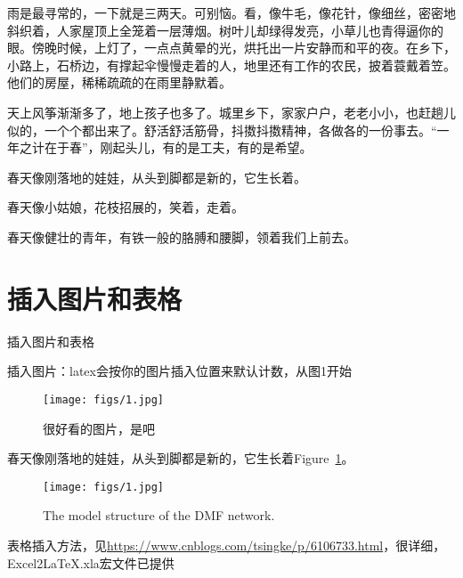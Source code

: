 \documentclass[UTF8]{ctexart}
\begin{document}
雨是最寻常的，一下就是三两天。可别恼。看，像牛毛，像花针，像细丝，密密地斜织着，人家屋顶上全笼着一层薄烟。树叶儿却绿得发亮，小草儿也青得逼你的眼。傍晚时候，上灯了，一点点黄晕的光，烘托出一片安静而和平的夜。在乡下，小路上，石桥边，有撑起伞慢慢走着的人，地里还有工作的农民，披着蓑戴着笠。他们的房屋，稀稀疏疏的在雨里静默着。

天上风筝渐渐多了，地上孩子也多了。城里乡下，家家户户，老老小小，也赶趟儿似的，一个个都出来了。舒活舒活筋骨，抖擞抖擞精神，各做各的一份事去。“一年之计在于春”，刚起头儿，有的是工夫，有的是希望。

春天像刚落地的娃娃，从头到脚都是新的，它生长着。

春天像小姑娘，花枝招展的，笑着，走着。

春天像健壮的青年，有铁一般的胳膊和腰脚，领着我们上前去。

\section{插入图片和表格}

插入图片和表格

插入图片：latex会按你的图片插入位置来默认计数，从图1开始
\begin{figure}
	\centering
	\texttt{[image: figs/1.jpg]} %
	\caption{很好看的图片，是吧} %
	\label{好看的图片} %
\end{figure}

春天像刚落地的娃娃，从头到脚都是新的，它生长着Figure~\ref{好看的图片}。

\begin{figure}
	\centering
	\texttt{[image: figs/1.jpg]}
	\caption{The model structure of the DMF network.}
	\label{fig:modell}
\end{figure}

表格插入方法，见\url{https://www.cnblogs.com/tsingke/p/6106733.html}，很详细，Excel2LaTeX.xla宏文件已提供
\end{document}
